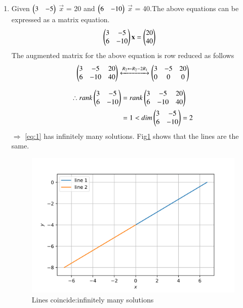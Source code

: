 \documentclass[journal,12pt,twocolumn]{IEEEtran}
\begin{document}
\begin{enumerate}
    \item Given $\begin{pmatrix}3&-5\end{pmatrix}$ $\vec{x}$ = 20 and $\begin{pmatrix}6&-10\end{pmatrix}$ $\vec{x}$ = 40.The above equations can be expressed as a matrix equation.
    \begin{align}
\label{eq:1}
  \begin{pmatrix}3&-5\\6&-10\end{pmatrix}\mathbf{x} &= \begin{pmatrix}20\\40\end{pmatrix}
\end{align}
The augmented matrix for the above equation
is row reduced as follows
\begin{align}
    \begin{pmatrix}3&-5&20\\6&-10&40\end{pmatrix}\xleftrightarrow{R_2\leftarrow R_2 -2R_1}\begin{pmatrix}3&-5&20\\0&0&0\end{pmatrix} \label{eq:(2)}
\end{align}

\begin{align}
    \therefore rank \begin{pmatrix}3&-5\\6&-10\end{pmatrix} &= rank\begin{pmatrix}3&-5&20\\6&-10&40\end{pmatrix}\\
    &=1 < dim\begin{pmatrix}3&-5\\6&-10\end{pmatrix}=2
\end{align}
$\Longrightarrow$ \ref{eq:1} has infinitely many solutions.
Fig\ref{fig:1} shows that the lines are the same.
\begin{figure}[H]
    \includegraphics[width= \columnwidth]{assignment2c-1.png}
    \caption{Lines coincide:infinitely many solutions}
    \label{fig:1}
\end{figure}



\end{enumerate}
\end{document}
